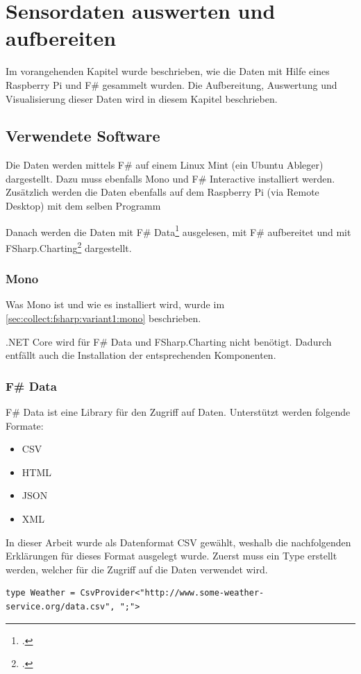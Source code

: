 
\chapter{Sensordaten auswerten und aufbereiten}\label{chap:AnalyseReporting}
Im vorangehenden Kapitel wurde beschrieben, wie die Daten mit Hilfe eines Raspberry Pi und F\# gesammelt wurden. Die Aufbereitung, Auswertung und Visualisierung dieser Daten wird in diesem Kapitel beschrieben.


\section{Verwendete Software}
\label{sec:display:software}
Die Daten werden mittels F\# auf einem Linux Mint (ein Ubuntu Ableger) dargestellt. Dazu muss ebenfalls Mono und F\# Interactive installiert werden. Zusätzlich werden die Daten ebenfalls auf dem Raspberry Pi (via Remote Desktop) mit dem selben Programm 

Danach werden die Daten mit F\# Data\footcite{FShaprp_Data_2016-06-17} ausgelesen, mit F\# aufbereitet und mit FSharp.Charting\footcite{FSharp_Charting_2016-06-17} dargestellt.

\subsection{Mono}
Was Mono ist und wie es installiert wird, wurde im \cref{sec:collect:fsharp:variant1:mono}  beschrieben.

.NET Core wird für F\# Data und FSharp.Charting nicht benötigt. Dadurch entfällt auch die Installation der entsprechenden Komponenten.

\subsection{F\# Data}
\label{sec:display:software:fsharpdata}
F\# Data ist eine Library für den Zugriff auf Daten. Unterstützt werden folgende Formate:
\begin{itemize}
\item CSV
\item HTML
\item JSON
\item XML
\end{itemize}

In dieser Arbeit wurde als Datenformat CSV gewählt, weshalb die nachfolgenden Erklärungen für dieses Format ausgelegt wurde.
Zuerst muss ein Type erstellt werden, welcher für die Zugriff auf die Daten verwendet wird.
\begin{lstlisting}
type Weather = CsvProvider<"http://www.some-weather-service.org/data.csv", ";">
\end{lstlisting}

